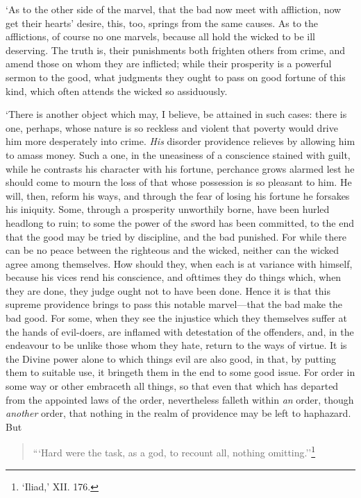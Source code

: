 \documentclass[12pt]{book}
\begin{document}
`As to the other side of the marvel, that the bad now meet with
affliction, now get their hearts' desire, this, too, springs from the
same causes. As to the afflictions, of course no one marvels, because
all hold the wicked to be ill deserving. The truth is, their punishments
both frighten others from crime, and amend those on whom they are
inflicted; while their prosperity is a powerful sermon to the good, what
judgments they ought to pass on good fortune of this kind, which often
attends the wicked so assiduously.

`There is another object which may, I believe, be attained in such
cases: there is one, perhaps, whose nature is so reckless and violent
that poverty would drive him more desperately into crime. \emph{His} disorder
providence relieves by allowing him to amass money. Such a one, in the
uneasiness of a conscience stained with guilt, while he contrasts his
character with his fortune, perchance grows alarmed lest he should come
to mourn the loss of that whose possession is so pleasant to him. He
will, then, reform his ways, and through the fear of losing his fortune
he forsakes his iniquity. Some, through a prosperity unworthily borne,
have been hurled headlong to ruin; to some the power of the sword has
been committed, to the end that the good may be tried by discipline, and
the bad punished. For while there can be no peace between the righteous
and the wicked, neither can the wicked agree among themselves. How
should they, when each is at variance with himself, because his vices
rend his conscience, and ofttimes they do things which, when they are
done, they judge ought not to have been done. Hence it is that this
supreme providence brings to pass this notable marvel---that the bad make
the bad good. For some, when they see the injustice which they
themselves suffer at the hands of evil-doers, are inflamed with
detestation of the offenders, and, in the endeavour to be unlike those
whom they hate, return to the ways of virtue. It is the Divine power
alone to which things evil are also good, in that, by putting them to
suitable use, it bringeth them in the end to some good issue. For order
in some way or other embraceth all things, so that even that which has
departed from the appointed laws of the order, nevertheless falleth
within \emph{an} order, though \emph{another} order, that nothing in the realm of
providence may be left to haphazard. But

\begin{quote}
  ```Hard were the task, as a god, to recount all, nothing omitting.''\footnote{`Iliad,’ XII. 176.}
\end{quote}
\end{document}
